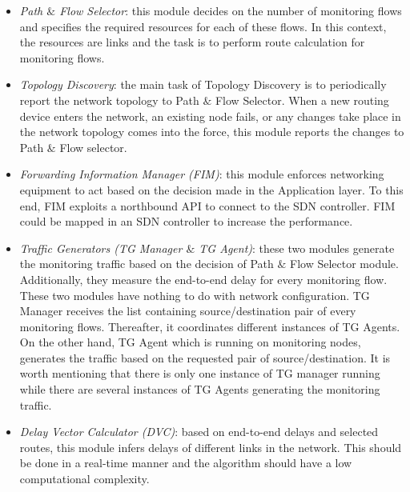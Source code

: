 \documentclass[10pt, journal, letterpaper]{IEEEtran}
\begin{document}
\begin{itemize}
    \item \textit{Path $\&$ Flow Selector}: this module decides on the number of monitoring flows and specifies the required resources for each of these flows. In this context, the resources are links and the task is to perform route calculation for monitoring flows.
    \item \textit{Topology Discovery}: the main task of Topology Discovery is to periodically report the network topology to Path $\&$ Flow Selector. When a new routing device enters the network, an existing node fails, or any changes take place in the network topology comes into the force, this module reports the changes to Path $\&$ Flow selector.
    \item \textit{Forwarding Information Manager (FIM)}: this module enforces networking equipment to act based on the decision made in the Application layer. To this end, FIM exploits a northbound API to connect to the SDN controller. FIM could be mapped in an SDN controller to increase the performance.
    \item \textit{Traffic Generators (TG Manager $\&$ TG Agent)}: these two modules generate the monitoring traffic based on the decision of Path $\&$ Flow Selector module. Additionally, they measure the end-to-end delay for every monitoring flow. These two modules have nothing to do with network configuration. TG Manager receives the list containing source/destination pair of every monitoring flows. Thereafter, it coordinates different instances of TG Agents. On the other hand, TG Agent which is running on monitoring nodes, generates the traffic based on the requested pair of source/destination. It is worth mentioning that there is only one instance of TG manager running while there are several instances of TG Agents generating the monitoring traffic.
    \item \textit{Delay Vector Calculator (DVC)}: based on end-to-end delays and selected routes, this module infers delays of different links in the network. This should be done in a real-time manner and the algorithm should have a low computational complexity.
\end{itemize}
\end{document}

